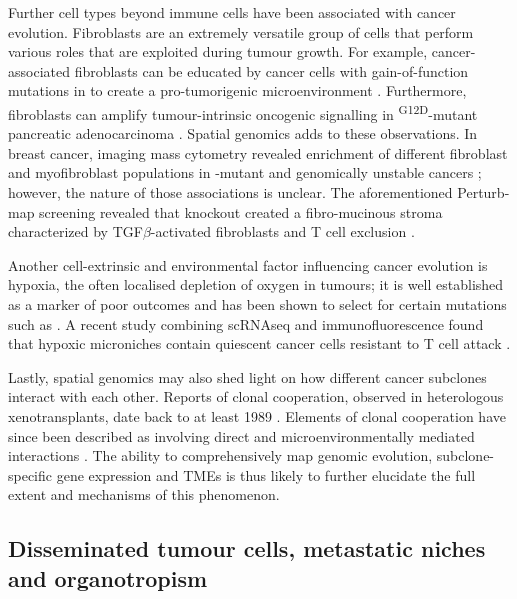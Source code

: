 Further cell types beyond immune cells have been associated with cancer evolution. Fibroblasts are an extremely versatile group of cells that perform various roles that are exploited during tumour growth. For example, cancer-associated fibroblasts can be educated by cancer cells with gain-of-function mutations in  to create a pro-tumorigenic microenvironment \parencite{Vennin2019-cf}. Furthermore, fibroblasts can amplify tumour-intrinsic oncogenic signalling in \textsuperscript{G12D}-mutant pancreatic adenocarcinoma \parencite{Tape2016-hb}. Spatial genomics adds to these observations. In breast cancer, imaging mass cytometry  revealed enrichment of different fibroblast and myofibroblast populations in -mutant and genomically unstable cancers \parencite{Ali2020-zo}; however, the nature of those associations is unclear. The aforementioned Perturb-map screening revealed that  knockout created a fibro-mucinous stroma characterized by TGF$\beta$-activated fibroblasts and T cell exclusion \parencite{Dhainaut2022-nj}.

Another cell-extrinsic and environmental factor influencing cancer evolution is hypoxia, the often localised depletion of oxygen in tumours; it is well established as a marker of poor outcomes \parencite{Harris2002-ty} and has been shown to select for certain mutations such as  \parencite{Graeber1996-em}. A recent study combining \ac{scRNAseq} and immunofluorescence found that hypoxic microniches contain quiescent cancer cells resistant to T cell attack \parencite{Baldominos2022-xe}.

Lastly, spatial genomics may also shed light on how different cancer subclones interact with each other. Reports of clonal cooperation, observed in heterologous xenotransplants, date back to at least 1989 \parencite{Miller1989-hp}. Elements of clonal cooperation have since been described as involving direct and microenvironmentally mediated interactions \parencite{Alonso-Curbelo2021-dq,Cleary2014-hg,Zhou2017-nm,Tammela2017-nd,Williams2020-fj}. The ability to comprehensively map genomic evolution, subclone-specific gene expression and \ac{TME}s is thus likely to further elucidate the full extent and mechanisms of this phenomenon.

\subsection*{Disseminated tumour cells, metastatic niches and organotropism}

